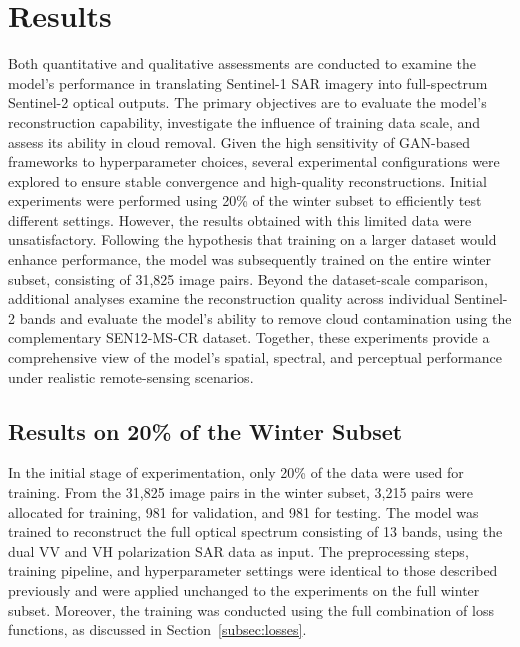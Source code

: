 \chapter{Results}
\label{chapter:results}
Both quantitative and qualitative assessments are conducted to examine the model’s performance in translating Sentinel-1 SAR imagery into full-spectrum Sentinel-2 optical outputs. The primary objectives are to evaluate the model’s reconstruction capability, investigate the influence of training data scale, and assess its ability in cloud removal.
Given the high sensitivity of GAN-based frameworks to hyperparameter choices, several experimental configurations were explored to ensure stable convergence and high-quality reconstructions. Initial experiments were performed using 20\% of the winter subset to efficiently test different settings. However, the results obtained with this limited data were unsatisfactory. Following the hypothesis that training on a larger dataset would enhance performance, the model was subsequently trained on the entire winter subset, consisting of 31,825 image pairs.
Beyond the dataset-scale comparison, additional analyses examine the reconstruction quality across individual Sentinel-2 bands and evaluate the model’s ability to remove cloud contamination using the complementary SEN12-MS-CR dataset. Together, these experiments provide a comprehensive view of the model’s spatial, spectral, and perceptual performance under realistic remote-sensing scenarios.

\section{Results on 20\% of the Winter Subset}
In the initial stage of experimentation, only 20\% of the data were used for training. From the 31,825 image pairs in the winter subset, 3,215 pairs were allocated for training, 981 for validation, and 981 for testing. The model was trained to reconstruct the full optical spectrum consisting of 13 bands, using the dual VV and VH polarization SAR data as input.
The preprocessing steps, training pipeline, and hyperparameter settings were identical to those described previously and were applied unchanged to the experiments on the full winter subset. Moreover, the training was conducted using the full combination of loss functions, as discussed in Section~\ref{subsec:losses}.

